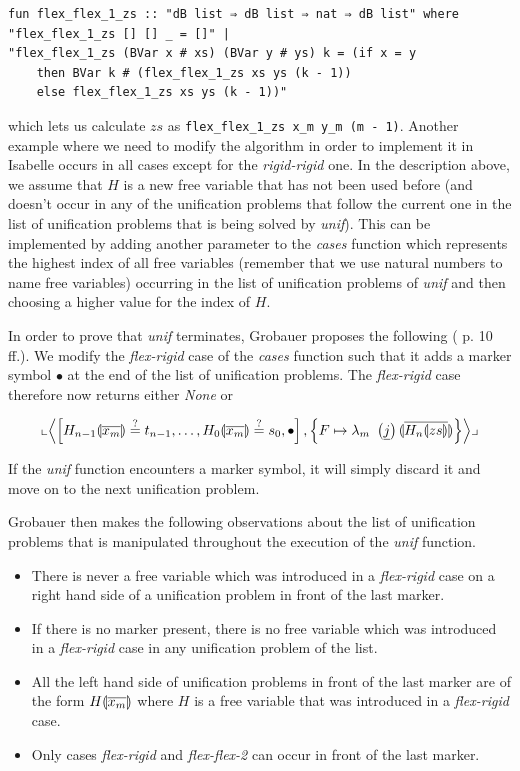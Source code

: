\begin{verbatim}
fun flex_flex_1_zs :: "dB list ⇒ dB list ⇒ nat ⇒ dB list" where
"flex_flex_1_zs [] [] _ = []" |
"flex_flex_1_zs (BVar x # xs) (BVar y # ys) k = (if x = y
	then BVar k # (flex_flex_1_zs xs ys (k - 1))
	else flex_flex_1_zs xs ys (k - 1))"
\end{verbatim}

which lets us calculate $zs$ as \texttt{flex\_flex\_1\_zs x\_m y\_m (m - 1)}. Another example where we need to modify the algorithm in order to implement it in Isabelle occurs in all cases except for the \textit{rigid-rigid} one. In the description above, we assume that $H$ is a new free variable that has not been used before (and doesn't occur in any of the unification problems that follow the current one in the list of unification problems that is being solved by \textit{unif}). This can be implemented by adding another parameter to the \textit{cases} function which represents the highest index of all free variables (remember that we use natural numbers to name free variables) occurring in the list of unification problems of \textit{unif} and then choosing a higher value for the index of $H$.

In order to prove that \textit{unif} terminates, Grobauer proposes the following (\cite{Grobauer} p. 10 ff.). We modify the \textit{flex-rigid} case of the \textit{cases} function such that it adds a marker symbol $\bullet$ at the end of the list of unification problems. The \textit{flex-rigid} case therefore now returns either \textit{None} or

\[
\llcorner \left\langle \left[ H_{n - 1} \llparenthesis \overline{x_m} \rrparenthesis \overset{?}{=} t_{n - 1}, \dots, H_0 \llparenthesis \overline{x_m} \rrparenthesis \overset{?}{=} s_0, \bullet \right], \left\{ F \mapsto \lambda_{m} \ \left( \underline{j} \right) \llparenthesis \overline{H_n \llparenthesis zs \rrparenthesis} \rrparenthesis \right\} \right\rangle \lrcorner
\]

If the \textit{unif} function encounters a marker symbol, it will simply discard it and move on to the next unification problem.

Grobauer then makes the following observations about the list of unification problems that is manipulated throughout the execution of the \textit{unif} function.

\begin{itemize}
	\item There is never a free variable which was introduced in a \textit{flex-rigid} case on a right hand side of a unification problem in front of the last marker.
	\item If there is no marker present, there is no free variable which was introduced in a \textit{flex-rigid} case in any unification problem of the list.
	\item All the left hand side of unification problems in front of the last marker are of the form $H \llparenthesis \overline{x_m} \rrparenthesis$ where $H$ is a free variable that was introduced in a \textit{flex-rigid} case.
	\item Only cases \textit{flex-rigid} and \textit{flex-flex-2} can occur in front of the last marker.
\end{itemize}

